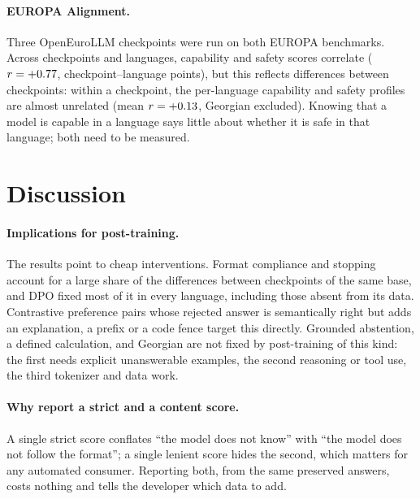 \documentclass[11pt]{article}
\begin{document}
\begin{table}[htbp]
\centering
\small
\caption{EUROPA item score (\%, higher is better) / EuroEval validation rank score (lower is better) per language, from the EuroEval European all-models snapshot of 12 October 2026 \citep{euroeval}.}
\label{tab:euroeval}

\end{table}

\paragraph{EUROPA Alignment.} Three OpenEuroLLM checkpoints were run on both EUROPA benchmarks. Across checkpoints and languages, capability and safety scores correlate ($r=+0.77$, \crossNPoints{} checkpoint--language points), but this reflects differences between checkpoints: within a checkpoint, the per-language capability and safety profiles are almost unrelated (mean $r=+0.13$, Georgian excluded). Knowing that a model is capable in a language says little about whether it is safe in that language; both need to be measured.

\section{Discussion}
\label{sec:discussion}

\paragraph{Implications for post-training.} The results point to cheap interventions. Format compliance and stopping account for a large share of the differences between checkpoints of the same base, and DPO fixed most of it in every language, including those absent from its data. Contrastive preference pairs whose rejected answer is semantically right but adds an explanation, a prefix or a code fence target this directly. Grounded abstention, a defined calculation, and Georgian are not fixed by post-training of this kind: the first needs explicit unanswerable examples, the second reasoning or tool use, the third tokenizer and data work.

\paragraph{Why report a strict and a content score.} A single strict score conflates ``the model does not know'' with ``the model does not follow the format''; a single lenient score hides the second, which matters for any automated consumer. Reporting both, from the same preserved answers, costs nothing and tells the developer which data to add.
\end{document}
